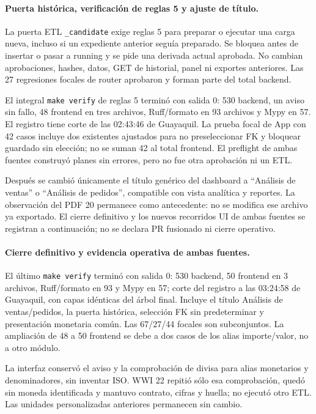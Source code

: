 \documentclass[11pt,letterpaper]{article}
\newcommand{\file}[1]{\texttt{#1}}
\begin{document}
\paragraph{Puerta histórica, verificación de reglas 5 y ajuste de título.}
La puerta ETL \file{\_candidate} exige reglas 5 para preparar o ejecutar una carga
nueva, incluso si un expediente anterior seguía preparado. Se bloquea antes de
insertar o pasar a running y se pide una derivada actual aprobada. No cambian
aprobaciones, hashes, datos, GET de historial, panel ni exportes anteriores.
Las 27 regresiones focales de router aprobaron y forman parte del total backend.

El integral \file{make verify} de reglas 5 terminó con salida 0: 530 backend,
un aviso sin fallo, 48 frontend en tres archivos, Ruff/formato en 93 archivos y
Mypy en 57. El registro  tiene corte de
las 02:43:46 de Guayaquil. La prueba focal de App con 42 casos incluye dos
existentes ajustados para no preseleccionar FK y bloquear guardado sin elección;
no se suman 42 al total frontend. El preflight de ambas fuentes construyó planes
sin errores, pero no fue otra aprobación ni un ETL.

Después se cambió únicamente el título genérico del dashboard a ``Análisis de
ventas'' o ``Análisis de pedidos'', compatible con vista analítica y reportes.
La observación del PDF 20 permanece como antecedente: no se modifica ese archivo
ya exportado. El cierre definitivo y los nuevos recorridos UI de ambas fuentes se
registran a continuación; no se declara PR fusionado ni cierre operativo.

\paragraph{Cierre definitivo y evidencia operativa de ambas fuentes.}
El último \file{make verify} terminó con salida 0: 530 backend, 50 frontend en
3 archivos, Ruff/formato en 93 y Mypy en 57; corte del registro
 a las 03:24:58 de Guayaquil,
con capas idénticas del árbol final. Incluye el título Análisis de ventas/pedidos,
la puerta histórica, selección FK sin predeterminar y presentación monetaria
común. Las 67/27/44 focales son subconjuntos. La ampliación de 48 a 50 frontend
se debe a dos casos de los alias importe/valor, no a otro módulo.

La interfaz conservó el aviso y la comprobación de divisa para alias monetarios
y denominadores, sin inventar ISO. WWI 22 repitió sólo esa comprobación, quedó
sin moneda identificada y mantuvo contrato, cifras y huella; no ejecutó otro ETL.
Las unidades personalizadas anteriores permanecen sin cambio.
\end{document}
